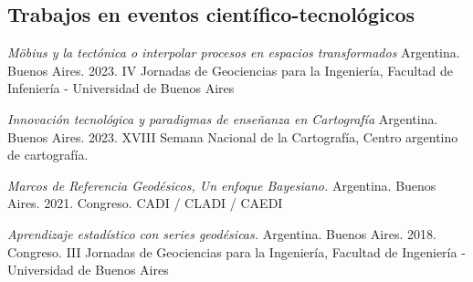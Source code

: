 \documentclass[11pt,a4paper,sans]{moderncv}        %
\begin{document}

\subsection{Trabajos en eventos científico-tecnológicos}

 {\textit{Möbius y la tectónica o interpolar procesos en espacios transformados} Argentina. Buenos Aires. 2023. IV Jornadas de Geociencias para la Ingeniería, Facultad de Infeniería - Universidad de Buenos Aires }

 {\textit{Innovación tecnológica y paradigmas de enseñanza en Cartografía} Argentina. Buenos Aires. 2023. XVIII Semana Nacional de la Cartografía, Centro argentino de cartografía. }

 {\textit{Marcos de Referencia Geodésicos, Un enfoque Bayesiano.} Argentina. Buenos Aires. 2021. Congreso. CADI / CLADI / CAEDI }


 {\textit{Aprendizaje estadístico con series geodésicas.} Argentina. Buenos Aires. 2018. Congreso. III Jornadas de Geociencias para la Ingeniería, Facultad de Ingeniería - Universidad de Buenos Aires}

\end{document}
